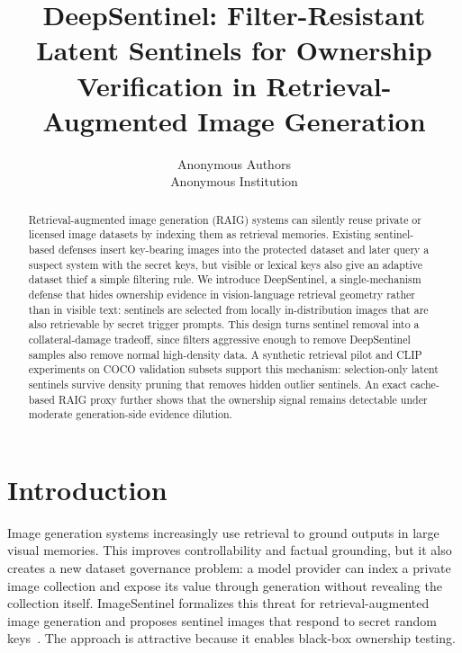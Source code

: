 \documentclass[letterpaper,twocolumn,10pt]{article}
\begin{document}
\date{}

\title{\Large \bf DeepSentinel: Filter-Resistant Latent Sentinels for Ownership Verification in Retrieval-Augmented Image Generation}

\author{
{\rm Anonymous Authors}\\
Anonymous Institution
}

\maketitle

\begin{abstract}
Retrieval-augmented image generation (RAIG) systems can silently reuse private
or licensed image datasets by indexing them as retrieval memories. Existing
sentinel-based defenses insert key-bearing images into the protected dataset and
later query a suspect system with the secret keys, but visible or lexical keys
also give an adaptive dataset thief a simple filtering rule. We introduce
DeepSentinel, a single-mechanism defense that hides ownership evidence in
vision-language retrieval geometry rather than in visible text: sentinels are
selected from locally in-distribution images that are also retrievable by secret
trigger prompts. This design turns sentinel removal into a
collateral-damage tradeoff, since filters aggressive enough to remove
DeepSentinel samples also remove normal high-density data. A synthetic retrieval
pilot and CLIP experiments on COCO validation subsets support this mechanism:
selection-only latent sentinels survive density pruning that removes hidden
outlier sentinels. An exact cache-based RAIG proxy further shows that the
ownership signal remains detectable under moderate generation-side evidence
dilution.
\end{abstract}

\section{Introduction}

Image generation systems increasingly use retrieval to ground outputs in large
visual memories. This improves controllability and factual grounding, but it
also creates a new dataset governance problem: a model provider can index a
private image collection and expose its value through generation without
revealing the collection itself. ImageSentinel formalizes this threat for
retrieval-augmented image generation and proposes sentinel images that respond
to secret random keys~\cite{imagesentinel2025}. The approach is attractive
because it enables black-box ownership testing.
\end{document}
